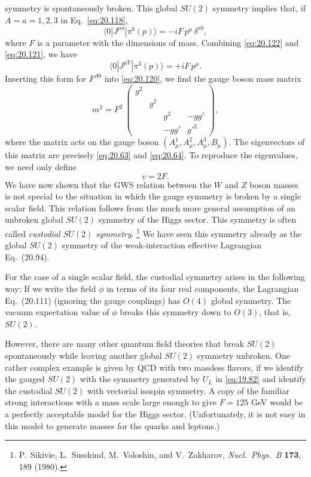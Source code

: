 symmetry is spontaneously broken.  This global $SU(2)$ symmetry implies that,
if $A = a = 1, 2, 3$ in Eq.~\eqref{eq:20.118},
\begin{equation}
  \langle 0|J^{\mu a}|\pi^b(p)\rangle = -iF\,p^\mu\,\delta^{ab} ,
  \label{eq:20.122}
\end{equation}
where $F$ is a parameter with the dimensions of mass.  Combining
\eqref{eq:20.122} and \eqref{eq:20.121}, we have
\begin{equation}
  \langle 0|J^{\mu Y}|\pi^3(p)\rangle = +iF\,p^\mu .
  \label{eq:20.123}
\end{equation}
Inserting this form for $F^{Ab}$ into \eqref{eq:20.120}, we find the gauge
boson mass matrix
\begin{equation}
  m^2 = F^2\ \begin{pmatrix}
    g^2 & & & \\
    & g^2 & & \\
    & & g^2 & -gg'\\
    & & -gg' & g'^2
  \end{pmatrix},
  \label{eq:20.124}
\end{equation}
where the matrix acts on the gauge boson $(A^1_\mu, A^2_\mu, A^3_\mu, B_\mu)$.
The eigenvectors of this matrix are precisely \eqref{eq:20.63} and
\eqref{eq:20.64}.  To reproduce the eigenvalues, we need only define
\begin{equation}
  v = 2F .
  \label{eq:20.125}
\end{equation}
We have now shown that the GWS relation between the $W$ and $Z$ boson masses
is not special to the situation in which the gauge symmetry is broken by a
single scalar field.  This relation follows from the much more general
assumption of an unbroken global $SU(2)$ symmetry of the Higgs sector.  This
symmetry is often called \emph{custodial $SU(2)$ symmetry}.%
\footnote{P.~Sikivie, L.~Susskind, M.~Voloshin, and V.~Zakharov,
\emph{Nucl.\ Phys.\ B} \textbf{173}, 189 (1980).}  We have seen this symmetry
already as the global $SU(2)$ symmetry of the weak-interaction effective
Lagrangian Eq.~(20.94).

For the case of a single scalar field, the custodial symmetry arises in the
following way: If we write the field $\phi$ in terms of its four real
components, the Lagrangian Eq.~(20.111) (ignoring the gauge couplings)
has $O(4)$ global symmetry.  The vacuum expectation value of $\phi$ breaks
this symmetry down to $O(3)$, that is, $SU(2)$.

However, there are many other quantum field theories that break $SU(2)$
spontaneously while leaving another global $SU(2)$ symmetry unbroken.  One
rather complex example is given by QCD with two massless flavors, if we
identify the gauged $SU(2)$ with the symmetry generated by $U_L$ in
\eqref{eq:19.82} and identify the custodial $SU(2)$ with vectorial isospin
symmetry.  A copy of the familiar strong interactions with a mass scale large
enough to give $F = 125$ GeV would be a perfectly acceptable model for the
Higgs sector.  (Unfortunately, it is not easy in this model to generate masses
for the quarks and leptons.)


